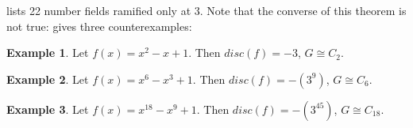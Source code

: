 \documentclass[12pt]{extarticle}
\newcommand{\<}{\langle}
\renewcommand{\>}{\rangle}
\theoremstyle{definition}
\newtheorem*{example}{Example}
\begin{document}
\cite{JONE2} lists 22 number fields ramified only at 3. Note that the converse of this theorem is not true: \cite{JONE2} gives three counterexamples: 
\begin{example}
Let $f(x) = x^2-x+1$. Then $disc(f) = -3$, $G \cong C_2$.
\end{example}
\begin{example}
Let $f(x) = x^6-x^3+1$. Then $disc(f) = -(3^9)$, $G \cong C_6$.
\end{example}
\begin{example}
Let $f(x) = x^{18}-x^9+1$. Then $disc(f) = -(3^{45})$, $G \cong C_{18}$.
\end{example}





% 

\end{document}
